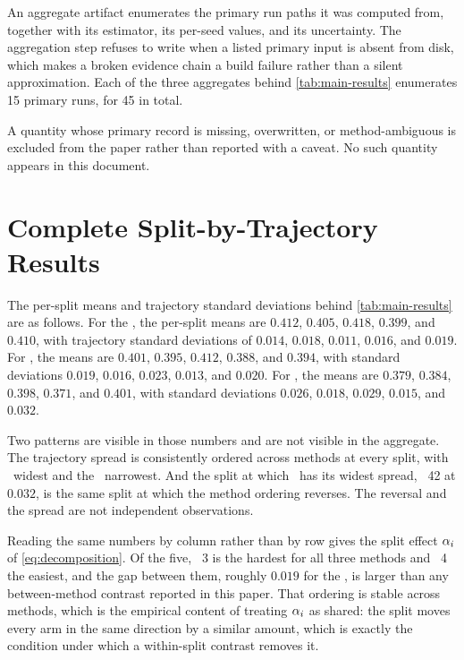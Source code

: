 An aggregate artifact enumerates the primary run paths it was computed from,
together with its estimator, its per-seed values, and its uncertainty. The
aggregation step refuses to write when a listed primary input is absent from
disk, which makes a broken evidence chain a build failure rather than a silent
approximation. Each of the three aggregates behind \cref{tab:main-results}
enumerates 15 primary runs, for 45 in total.

A quantity whose primary record is missing, overwritten, or method-ambiguous is
excluded from the paper rather than reported with a caveat. No such quantity
appears in this document.

\section{Complete Split-by-Trajectory Results}
\label{sec:appendix-complete}

The per-split means and trajectory standard deviations behind
\cref{tab:main-results} are as follows. For the \methodcontrol, the per-split
means are $0.412$, $0.405$, $0.418$, $0.399$, and $0.410$, with trajectory
standard deviations of $0.014$, $0.018$, $0.011$, $0.016$, and $0.019$. For
\methodmax, the means are $0.401$, $0.395$, $0.412$, $0.388$, and $0.394$, with
standard deviations $0.019$, $0.016$, $0.023$, $0.013$, and $0.020$. For
\methodrandom, the means are $0.379$, $0.384$, $0.398$, $0.371$, and $0.401$,
with standard deviations $0.026$, $0.018$, $0.029$, $0.015$, and $0.032$.

Two patterns are visible in those numbers and are not visible in the aggregate.
The trajectory spread is consistently ordered across methods at every split, with
\methodrandom\ widest and the \methodcontrol\ narrowest. And the split at which
\methodrandom\ has its widest spread, \splitseed~42 at $0.032$, is the same split
at which the method ordering reverses. The reversal and the spread are not
independent observations.

Reading the same numbers by column rather than by row gives the split effect
$\alpha_{i}$ of \cref{eq:decomposition}. Of the five, \splitseed~3 is the hardest for all
three methods and \splitseed~4 the easiest, and the gap between them,
roughly $0.019$ for the \methodcontrol, is larger than any between-method
contrast reported in this paper. That ordering is stable across methods, which is
the empirical content of treating $\alpha_{i}$ as shared: the split moves
every arm in the same direction by a similar amount, which is exactly the
condition under which a within-split contrast removes it.

